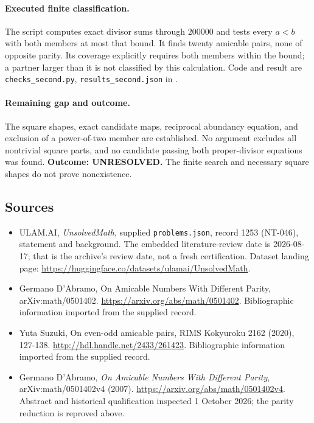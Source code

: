 \documentclass[11pt,a4paper]{article}
\begin{document}
\paragraph{Executed finite classification.}
The script computes exact divisor sums through $200000$ and tests
every $a<b$ with both members at most that bound. It finds twenty
amicable pairs, none of opposite parity. Its coverage explicitly
requires both members within the bound; a partner larger than it is
not classified by this calculation. Code and result are
\texttt{checks\_second.py}, \texttt{results\_second.json} in
.

\paragraph{Remaining gap and outcome.}
The square shapes, exact candidate maps, reciprocal abundancy equation,
and exclusion of a power-of-two member are established. No argument
excludes all nontrivial square parts, and no candidate passing both
proper-divisor equations was found. \textbf{Outcome: UNRESOLVED.}
The finite search and necessary square shapes do not prove nonexistence.

\subsection{Sources}

{\small

\begin{itemize}

\item[\hypertarget{source:1253:1}{S1}] ULAM.AI, \emph{UnsolvedMath}, supplied \texttt{problems.json}, record 1253 (NT-046), statement and background. The embedded literature-review date is 2026-08-17; that is the archive’s review date, not a fresh certification. Dataset landing page: \url{https://huggingface.co/datasets/ulamai/UnsolvedMath}.

\item[\hypertarget{source:1253:2}{S2}] Germano D'Abramo, On Amicable Numbers With Different Parity, arXiv:math/0501402. \url{https://arxiv.org/abs/math/0501402}. Bibliographic information imported from the supplied record.

\item[\hypertarget{source:1253:3}{S3}] Yuta Suzuki, On even-odd amicable pairs, RIMS Kokyuroku 2162 (2020), 127-138. \url{http://hdl.handle.net/2433/261423}. Bibliographic information imported from the supplied record.


\item[E1] Germano D'Abramo, \emph{On Amicable Numbers With Different
Parity}, arXiv:math/0501402v4 (2007).
\url{https://arxiv.org/abs/math/0501402v4}. Abstract and historical
qualification inspected 1 October 2026; the parity reduction is reproved above.

\end{itemize}

}

\label{end:1253}
\end{document}
